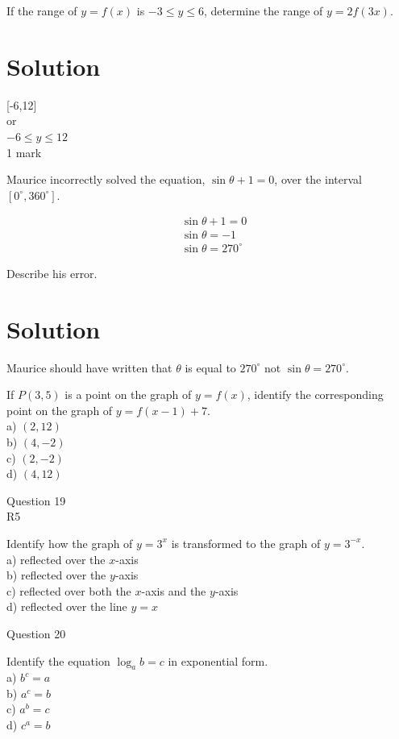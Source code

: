 \documentclass[10pt]{article}
\begin{document}
If the range of $y=f(x)$ is $-3 \leq y \leq 6$, determine the range of $y=2 f(3 x)$.

\section*{Solution}
[-6,12]\\
or\\
$-6 \leq y \leq 12$\\
1 mark

Maurice incorrectly solved the equation, $\sin \theta+1=0$, over the interval $\left[0^{\circ}, 360^{\circ}\right]$.

$$
\begin{aligned}
& \sin \theta+1=0 \\
& \sin \theta=-1 \\
& \sin \theta=270^{\circ}
\end{aligned}
$$

Describe his error.

\section*{Solution}
Maurice should have written that $\theta$ is equal to $270^{\circ}$ not $\sin \theta=270^{\circ}$.

If $P(3,5)$ is a point on the graph of $y=f(x)$, identify the corresponding point on the graph of $y=f(x-1)+7$.\\
a) $(2,12)$\\
b) $(4,-2)$\\
c) $(2,-2)$\\
d) $(4,12)$

Question 19\\
R5

Identify how the graph of $y=3^{x}$ is transformed to the graph of $y=3^{-x}$.\\
a) reflected over the $x$-axis\\
b) reflected over the $y$-axis\\
c) reflected over both the $x$-axis and the $y$-axis\\
d) reflected over the line $y=x$

Question 20

Identify the equation $\log _{a} b=c$ in exponential form.\\
a) $b^{c}=a$\\
b) $a^{c}=b$\\
c) $a^{b}=c$\\
d) $c^{a}=b$
\end{document}
